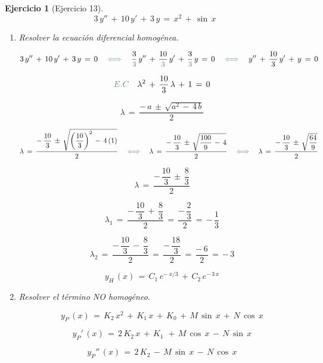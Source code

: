 \documentclass[a4paper,11pt, openany]{book}
\newtheorem{ejer}{Ejercicio}[section]
\newcommand*{\itembolasazules}[1]{%
\footnotesize\protect\tikz[baseline=-3pt]%
\protect\node[scale=.7, circle, shade, ball
color=green]{\color{white}\Large\bf#1};}
\begin{document}
\begin{ejer}[Ejercicio 13]
 
$$3\,y''\,+\,10\,y'\,+\,3\,y\,=\,x^{2}\,+\,\sin\,x$$
 
\begin{enumerate}[label=\itembolasazules{\arabic*}]
 
 
\item Resolver la ecuación diferencial homogénea.
 
$$3\,y''\,+\,10\,y'\,+\,3\,y\,=\,0 \quad \textcolor{aurometalsaurus}{\iff} \quad \dfrac{3}{\textcolor{aurometalsaurus}{3}}\,y''\,+\,\dfrac{10}{\textcolor{aurometalsaurus}{3}}\,y'\,+\,\dfrac{3}{\textcolor{aurometalsaurus}{3}}\,y\,=\,0 \quad \textcolor{aurometalsaurus}{\iff} \quad y''\,+\,\dfrac{10}{3}\,y'\,+\,y\,=\,0$$
 
$$\textcolor{aurometalsaurus}{E.C} \quad \lambda^{2}\,+\,\dfrac{10}{3}\,\lambda\,+\,1\,=\,0$$
 
$$\boxed{\lambda\,=\,\dfrac{-\,a\,\pm\,\sqrt{a^{2}\,-\,4\,b } }{2} }$$
 
$$\lambda\,=\,\dfrac{-\,\dfrac{10}{3}\,\pm\,\sqrt{\left(\dfrac{10}{3} \right)^{2}\,-\,4\,(1) } }{2} \quad \textcolor{aurometalsaurus}{\iff} \quad \lambda\,=\,\dfrac{-\,\dfrac{10}{3}\,\pm\,\sqrt{\dfrac{100}{9} \,-\,4 } }{2} \quad \textcolor{aurometalsaurus}{\iff} \quad \lambda\,=\,\dfrac{-\,\dfrac{10}{3}\,\pm\,\sqrt{\dfrac{64}{9} } }{2}$$
 
$$\lambda\,=\,\dfrac{-\,\dfrac{10}{3}\,\pm\,\dfrac{8}{3}}{2}$$
 
$$\lambda_{1}\,=\,\dfrac{-\,\dfrac{10}{3}\,+\,\dfrac{8}{3}}{2}\,=\,\dfrac{-\,\dfrac{2}{3} }{2}\,=\,\boxed{-\,\dfrac{1}{3}}$$
 
$$\lambda_{2}\,=\,\dfrac{-\,\dfrac{10}{3}\,-\,\dfrac{8}{3}}{2}\,=\,\dfrac{-\,\dfrac{18}{3}}{2}\,=\,\dfrac{-\,6}{2}\,=\,\boxed{-\,3}$$
 
$$\boxed{y_{H}\,(x)\,=\,C_{1}\,e^{-\,x/3}\,+\,C_{2}\,e^{-\,3\,x}}$$
 
\item Resolver el término NO homogéneo.
 
$$\boxed{y_{P}\,(x)\,=\,K_{2}\,x^{2}\,+\,K_{1}\,x\,+\,K_{0}\,+\,M\,\sin\,x\,+\,N\,\cos\,x}$$
 
$$\boxed{y_{P}'\,(x)\,=\,2\,K_{2}\,x\,+\,K_{1}\,\,+\,M\,\cos\,x\,-\,N\,\sin\,x}$$
 
$$\boxed{y_{P}''\,(x)\,=\,2\,K_{2}\,-\,M\,\sin\,x\,-\,N\,\cos\,x}$$
 

\end{enumerate}
\end{ejer}
\end{document}

